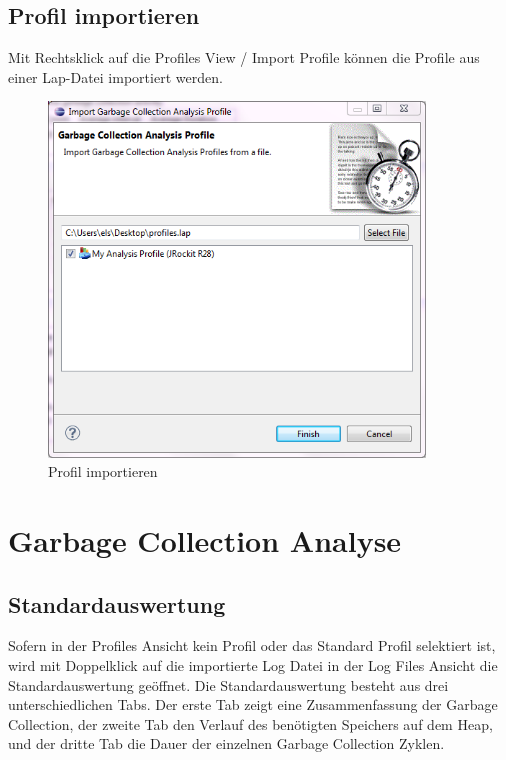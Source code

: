 \subsection{Profil importieren}

Mit Rechtsklick auf die Profiles View / Import Profile können die Profile aus einer Lap-Datei importiert werden.
 \begin{figure}[H]
  	\centering
    	\includegraphics[width=10cm]{images/tutorial_importprofile}
        	\caption{Profil importieren}
\end{figure}

\section{Garbage Collection Analyse}
\subsection{Standardauswertung}
Sofern in der Profiles Ansicht kein Profil oder das Standard Profil selektiert ist, wird mit Doppelklick auf die importierte Log Datei in der Log Files Ansicht die Standardauswertung geöffnet. Die Standardauswertung besteht aus drei unterschiedlichen Tabs. Der erste Tab zeigt eine Zusammenfassung der Garbage Collection, der zweite Tab den Verlauf des benötigten Speichers auf dem Heap, und der dritte Tab die Dauer der einzelnen Garbage Collection Zyklen. 

